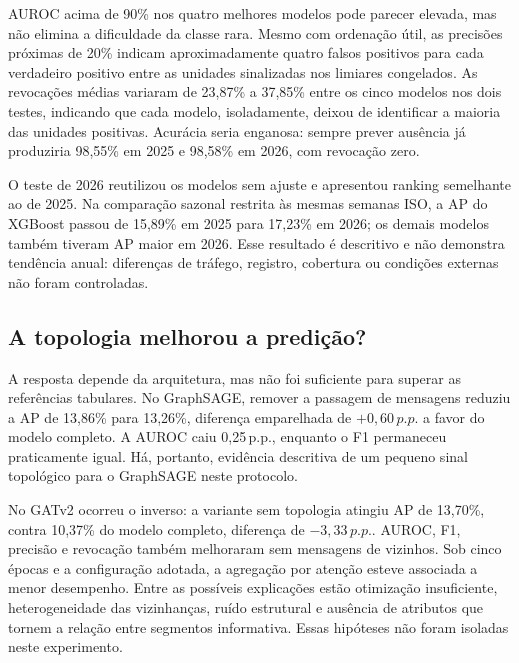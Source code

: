 \documentclass[12pt]{article}
\newcommand{\pp}{\,p.p.}
\begin{document}
AUROC acima de 90\% nos quatro melhores modelos pode parecer elevada,
mas não elimina a dificuldade da classe rara. Mesmo com ordenação útil,
as precisões próximas de 20\% indicam aproximadamente quatro falsos
positivos para cada verdadeiro positivo entre as unidades sinalizadas
nos limiares congelados. As revocações médias variaram de 23,87\% a
37,85\% entre os cinco modelos nos dois testes, indicando que cada
modelo, isoladamente, deixou de identificar a maioria das unidades
positivas. Acurácia seria enganosa: sempre prever ausência já produziria
98,55\% em 2025 e 98,58\% em 2026, com revocação zero.

O teste de 2026 reutilizou os modelos sem ajuste e apresentou ranking
semelhante ao de 2025. Na comparação sazonal restrita às mesmas semanas
ISO, a AP do XGBoost passou de 15,89\% em 2025 para 17,23\% em 2026;
os demais modelos também tiveram AP maior em 2026. Esse resultado é
descritivo e não demonstra tendência anual: diferenças de tráfego,
registro, cobertura ou condições externas não foram controladas.

\subsection{A topologia melhorou a predição?}

A resposta depende da arquitetura, mas não foi suficiente para superar
as referências tabulares. No GraphSAGE, remover a passagem de mensagens
reduziu a AP de 13,86\% para 13,26\%, diferença emparelhada de
$+0,60\pp$ a favor do modelo completo. A AUROC caiu 0,25\pp, enquanto
o F1 permaneceu praticamente igual. Há, portanto, evidência descritiva
de um pequeno sinal topológico para o GraphSAGE neste protocolo.

No GATv2 ocorreu o inverso: a variante sem topologia atingiu AP de
13,70\%, contra 10,37\% do modelo completo, diferença de
$-3,33\pp$. AUROC, F1, precisão e revocação também melhoraram sem
mensagens de vizinhos. Sob cinco épocas e a configuração adotada, a
agregação por atenção esteve associada a menor desempenho. Entre as
possíveis explicações estão otimização insuficiente, heterogeneidade
das vizinhanças, ruído estrutural e ausência de atributos que tornem a
relação entre segmentos informativa. Essas hipóteses não foram isoladas
neste experimento.
\end{document}
